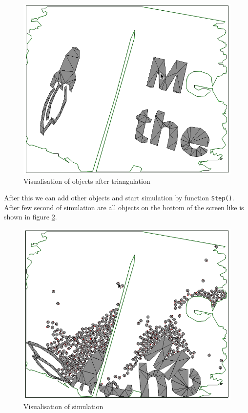 \documentclass{ifacconf}
\begin{document}
\begin{figure}[h]
\includegraphics[width=\columnwidth]{images/6dynamic-objets.png}
\caption{Visualisation of objects after triangulation}
\label{fig:objects}
\end{figure}

After this we can add other objects and start simulation by function \lstinline{Step()}.
After few second of simulation are all objects on the bottom of the screen like
is shown in figure \ref{fig:simulation}.

\begin{figure}[h]
\includegraphics[width=\columnwidth]{images/7dynamic-objets-simulation.png}
\caption{Visualisation of simulation}
\label{fig:simulation}
\end{figure}
\end{document}
